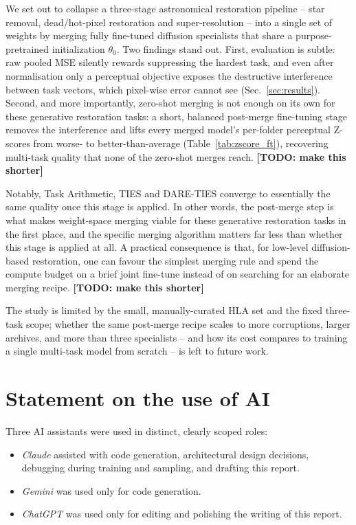 \documentclass{article}
\newcommand{\todo}[1]{\textbf{\color{red}[TODO: #1]}}
\begin{document}
We set out to collapse a three-stage astronomical restoration pipeline -- star removal, dead/hot-pixel restoration and super-resolution -- into a single set of weights by merging fully fine-tuned diffusion specialists that share a purpose-pretrained initialization $\theta_0$. Two findings stand out. First, evaluation is subtle: raw pooled MSE silently rewards suppressing the hardest task, and even after normalisation only a perceptual objective exposes the destructive interference between task vectors, which pixel-wise error cannot see (Sec.~\ref{sec:results}). Second, and more importantly, zero-shot merging is not enough on its own for these generative restoration tasks: a short, balanced post-merge fine-tuning stage removes the interference and lifts every merged model's per-folder perceptual Z-scores from worse- to better-than-average (Table~\ref{tab:zscore_ft}), recovering multi-task quality that none of the zero-shot merges reach. \todo{make this shorter}

Notably, Task Arithmetic, TIES and DARE-TIES converge to essentially the same quality once this stage is applied. In other words, the post-merge step is what makes weight-space merging viable for these generative restoration tasks in the first place, and the specific merging algorithm matters far less than whether this stage is applied at all. A practical consequence is that, for low-level diffusion-based restoration, one can favour the simplest merging rule and spend the compute budget on a brief joint fine-tune instead of on searching for an elaborate merging recipe. \todo{make this shorter}

The study is limited by the small, manually-curated HLA set and the fixed three-task scope; whether the same post-merge recipe scales to more corruptions, larger archives, and more than three specialists -- and how its cost compares to training a single multi-task model from scratch -- is left to future work.

\section{Statement on the use of AI}
\label{sec:ai}

Three AI assistants were used in distinct, clearly scoped roles:

\begin{itemize}
	\item \emph{Claude} assisted with code generation, architectural design decisions, debugging during training and sampling, and drafting this report.
	\item \emph{Gemini} was used only for code generation.
	\item \emph{ChatGPT} was used only for editing and polishing the writing of this report.
\end{itemize}
\end{document}
